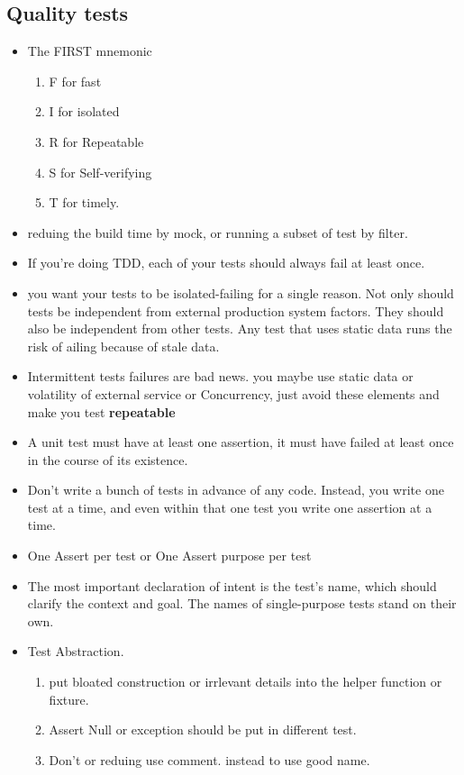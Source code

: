 \documentclass[a4paper,11pt,twoside]{book}
\begin{document}
\subsection{Quality tests}
\begin{itemize}
	\item The FIRST mnemonic 
	\begin{enumerate}
		\item F for fast
		\item I for isolated
		\item R for Repeatable
		\item S for Self-verifying
		\item T for timely.
	\end{enumerate}
	\item reduing the build time by mock, or running a subset of test by filter. 
	
	\item If you're doing TDD, each of your tests should always fail at least once. 
	
	\item you want your tests to be isolated-failing for a single reason. Not only should tests be independent from external production system factors. They should also be independent from other tests. Any test that uses static data runs the risk of ailing because of stale data. 
	
	\item Intermittent tests failures are bad news. you maybe use static data or volatility of external service or Concurrency, just avoid these elements and make you test \textbf{repeatable}
	
	\item A unit test must have at least one assertion, it must have failed at least once in the course of its existence. 
	
	\item Don't write a bunch of tests in advance of any code. Instead, you write one test at a time, and even within that one test you write one assertion at a time. 
	
\item One Assert per test or One Assert purpose per test 	\item The most important declaration of intent is the test's name, which should clarify the context and goal. The names of single-purpose tests stand on their own. 

\item Test Abstraction.
\begin{enumerate}
	\item put bloated construction or irrlevant details into the helper function or fixture. 
	\item Assert Null or exception should be put in different test.
	\item Don't or reduing use comment. instead to use good name. 
\end{enumerate}
\end{itemize}
\end{document}
